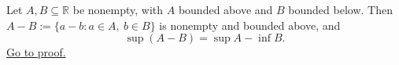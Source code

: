 \begin{theorem}
\label{thm:supremum-difference-set}
Let $A,B\subseteq\mathbb{R}$ be nonempty, with $A$ bounded above and $B$
bounded below.  Then $A-B:=\{a-b:a\in A,\ b\in B\}$ is nonempty and bounded
above, and
\[
  \sup(A-B)=\sup A-\inf B.
\]
\hyperref[prf:supremum-difference-set]{Go to proof.}
\end{theorem}